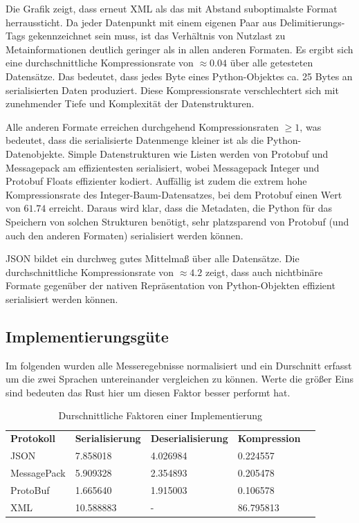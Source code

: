 \documentclass[ngerman]{seminarvorlage}
\begin{document}
Die Grafik zeigt, dass erneut XML als das mit Abstand suboptimalste Format herraussticht. Da jeder Datenpunkt mit einem eigenen Paar aus Delimitierungs-Tags gekennzeichnet sein muss, ist das Verhältnis von Nutzlast zu Metainformationen deutlich geringer als in allen anderen Formaten. Es ergibt sich eine durchschnittliche Kompressionsrate von $\approx 0.04$ über alle getesteten Datensätze. Das bedeutet, dass jedes Byte eines Python-Objektes ca. 25 Bytes an serialisierten Daten produziert. Diese Kompressionsrate verschlechtert sich mit zunehmender Tiefe und Komplexität der Datenstrukturen.

Alle anderen Formate erreichen durchgehend Kompressionsraten $\geq 1$, was bedeutet, dass die serialisierte Datenmenge kleiner ist als die Python-Datenobjekte. Simple Datenstrukturen wie Listen werden von Protobuf und Messagepack am effizientesten serialisiert, wobei Messagepack Integer und Protobuf Floats effizienter kodiert. Auffällig ist zudem die extrem hohe Kompressionsrate des Integer-Baum-Datensatzes, bei dem Protobuf einen Wert von $61.74$ erreicht. Daraus wird klar, dass die Metadaten, die Python für das Speichern von solchen Strukturen benötigt, sehr platzsparend von Protobuf (und auch den anderen Formaten) serialisiert werden können.

JSON bildet ein durchweg gutes Mittelmaß über alle Datensätze. Die durchschnittliche Kompressionsrate von $\approx 4.2$ zeigt, dass auch nichtbinäre Formate gegenüber der nativen Repräsentation von Python-Objekten effizient serialisiert werden können.

\newpage

\subsection{Implementierungsgüte}
Im folgenden wurden alle Messeregebnisse normalisiert und ein Durschnitt erfasst um die zwei Sprachen untereinander vergleichen zu können. Werte die größer Eins sind bedeuten das Rust hier um diesen Faktor besser performt hat.

\begin{table}[H]
    \begin{tabular}{|l|l|l|l|l}
    \cline{1-4}
    \textbf{Protokoll} & \textbf{Serialisierung} & \textbf{Deserialisierung} & \textbf{Kompression} &  \\ \cline{1-4}
    JSON               & 7.858018                & 4.026984                  & 0.224557               &  \\ \cline{1-4}
    MessagePack        & 5.909328                & 2.354893                  & 0.205478               &  \\ \cline{1-4}
    ProtoBuf           & 1.665640                & 1.915003                  & 0.106578               &  \\ \cline{1-4}
    XML                & 10.588883               & -                         & 86.795813              &  \\ \cline{1-4}
    \end{tabular}
    \caption{Durschnittliche Faktoren einer Implementierung}
\end{table}
\end{document}
